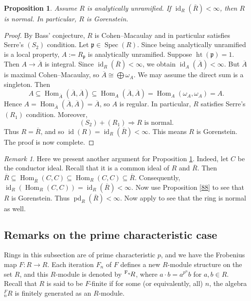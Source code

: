 \documentclass[10. pt,a4paper]{amsart}
\newtheorem{proposition}[theorem]{Proposition}
\theoremstyle{definition}
\theoremstyle{remark}
\newtheorem{remark}[theorem]{Remark}\newtheorem{fact}[theorem]{Fact}
\newcommand{\F}{\operatorname{F}}
\newcommand{\Spec}{\operatorname{Spec}}
\newcommand{\id}{\operatorname{id}}
\newcommand{\pd}{\operatorname{pd}}
\newcommand{\Hom}{\operatorname{Hom}}
\begin{document}
\begin{proposition}\label{811}
	Assume $R$ is analytically unramified. If $\id_R(\overline{R}) < \infty$, then $R$ is normal. In particular, $R$ is Gorenstein.
\end{proposition}

\begin{proof}
	By Bass'  conjecture, $R$ is Cohen--Macaulay and in particular satisfies Serre's $(S_2)$ condition. Let $\mathfrak{p} \in \Spec(R)$. Since being analytically unramified is a local property, $A := R_{\mathfrak{p}}$ is analytically unramified. Suppose $\operatorname{ht}(\mathfrak{p}) = 1$. Then $A \to \overline{A}$ is integral. Since $\id_R(\overline{R}) < \infty$, we obtain $\id_A(\overline{A}) < \infty$. But $\overline{A}$ is maximal Cohen--Macaulay, so $\overline{A} \cong \bigoplus \omega_A$. We may assume the direct sum is a singleton. Then
	\[
	A \subseteq \operatorname{Hom}_{\overline{A}}(\overline{A}, \overline{A}) \subseteq \operatorname{Hom}_A(\overline{A}, \overline{A}) = \operatorname{Hom}_A(\omega_A, \omega_A) = A.
	\]
	Hence $A = \operatorname{Hom}_{\overline{A}}(\overline{A}, \overline{A}) = \overline{A}$, so $A$ is regular. In particular, $R$ satisfies Serre's $(R_1)$ condition. Moreover,
	\[
	(S_2) + (R_1) \Longrightarrow R \text{ is normal}.
	\]
	Thus $R = \overline{R}$, and so $\id(R) = \id_R(\overline{R}) < \infty$. This means $R$ is Gorenstein. The proof is now complete.
\end{proof}

\begin{remark}
	Here we present another argument for Proposition \ref{811}. Indeed, let $C$ be the conductor ideal. Recall that it is a common ideal of $R$ and $\overline{R}$. Then $\overline{R} \subseteq \Hom_{\overline{R}}(C, C) \subseteq \Hom_R(C, C) \subseteq \overline{R}$. Consequently, $\id_R(\Hom_R(C, C)) = \id_R(\overline{R}) < \infty$. Now use Proposition \ref{88} to see that $R$ is Gorenstein. Thus $\pd_R(\overline{R}) < \infty$. Now apply \cite[6.15]{Elham} to see that the ring is normal as well.
\end{remark}

\subsection{Remarks on the prime characteristic case}

Rings in this subsection are of prime characteristic $p$, and we have the Frobenius map $F : R \to R$. Each iteration $F_n$ of $F$ defines a new $R$-module structure on the set $R$, and this $R$-module is denoted by $\up{\F_n} R$, where $a \cdot b = a^{p^n} b$ for $a, b \in R$. Recall that $R$ is said to be $F$-finite if for some (or equivalently, all) $n$, the algebra ${}^F_n R$ is finitely generated as an $R$-module.
\end{document}
